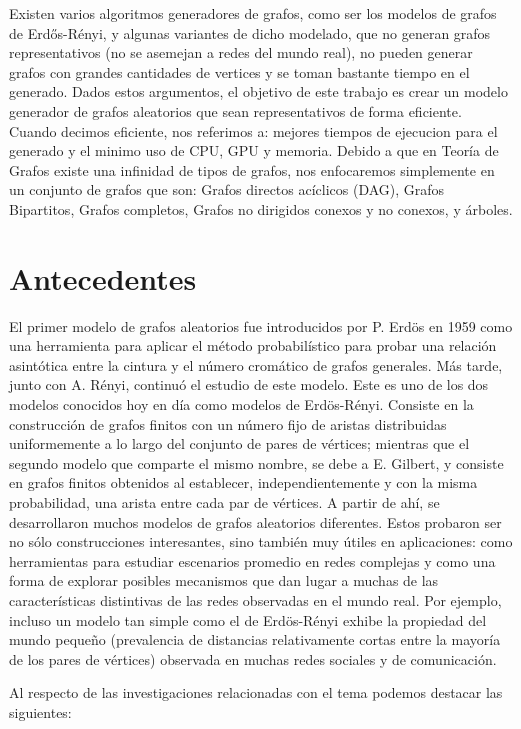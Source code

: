 \documentclass[11pt]{extarticle}
\begin{document}
Existen varios algoritmos generadores de grafos, como ser los modelos de grafos de Erdős-Rényi,
y algunas variantes de dicho modelado, que no generan grafos representativos (no se asemejan a redes del mundo real), no pueden generar grafos con grandes 
cantidades de vertices y se toman bastante tiempo en 
el generado. Dados estos argumentos,  el objetivo de este trabajo es crear un modelo generador de grafos aleatorios que sean representativos de 
forma eficiente. Cuando decimos eficiente, nos referimos a: mejores tiempos de ejecucion para
el generado y el minimo uso de CPU, GPU y memoria. \hfill \break \break
Debido a que en Teoría de Grafos existe una infinidad de tipos de grafos, nos enfocaremos simplemente en un conjunto 
de grafos que son: Grafos directos acíclicos (DAG), Grafos Bipartitos, Grafos completos, 
Grafos no dirigidos conexos y no conexos, y árboles.

\section{Antecedentes}
El primer modelo de grafos aleatorios fue introducidos por P. Erdös en 1959 como una
herramienta para aplicar el método probabilístico para probar una relación asintótica entre
la cintura y el número cromático de grafos generales. Más tarde, junto con A. Rényi,
continuó el estudio de este modelo. Este es uno de los dos modelos conocidos
hoy en día como modelos de Erdös-Rényi. Consiste en la construcción de grafos finitos con un
número fijo de aristas distribuidas uniformemente a lo largo del conjunto de pares de vértices;
mientras que el segundo modelo que comparte el mismo nombre, se debe a E. Gilbert, y
consiste en grafos finitos obtenidos al establecer, independientemente y con la misma probabilidad, una arista entre cada par de vértices. A partir de ahí, se desarrollaron muchos modelos
de grafos aleatorios diferentes. Estos probaron ser no sólo construcciones interesantes, sino
también muy útiles en aplicaciones: como herramientas para estudiar escenarios promedio en
redes complejas y como una forma de explorar posibles mecanismos que dan lugar a muchas
de las características distintivas de las redes observadas en el mundo real. Por ejemplo, incluso
un modelo tan simple como el de Erdös-Rényi exhibe la propiedad del mundo pequeño (prevalencia de distancias relativamente cortas entre la mayoría de los pares de vértices) observada
en muchas redes sociales y de comunicación.

Al respecto de las investigaciones relacionadas con el tema podemos destacar las siguientes:
\end{document}
